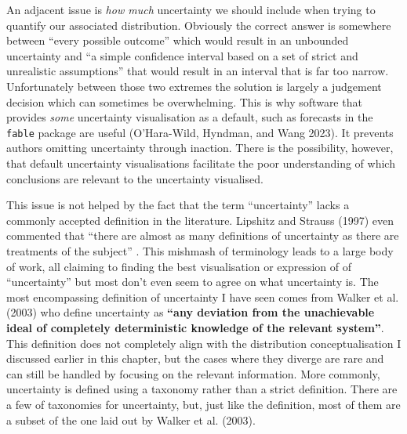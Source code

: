 \documentclass[
  letterpaper,
  DIV=11,
  numbers=noendperiod]{scrartcl}
\begin{document}
An adjacent issue is \emph{how much} uncertainty we should include when
trying to quantify our associated distribution. Obviously the correct
answer is somewhere between ``every possible outcome'' which would
result in an unbounded uncertainty and ``a simple confidence interval
based on a set of strict and unrealistic assumptions'' that would result
in an interval that is far too narrow. Unfortunately between those two
extremes the solution is largely a judgement decision which can
sometimes be overwhelming. This is why software that provides
\emph{some} uncertainty visualisation as a default, such as forecasts in
the \texttt{fable} package are useful (O'Hara-Wild, Hyndman, and Wang
2023). It prevents authors omitting uncertainty through inaction. There
is the possibility, however, that default uncertainty visualisations
facilitate the poor understanding of which conclusions are relevant to
the uncertainty visualised.

This issue is not helped by the fact that the term ``uncertainty'' lacks
a commonly accepted definition in the literature. Lipshitz and Strauss
(1997) even commented that ``there are almost as many definitions of
uncertainty as there are treatments of the subject'' . This mishmash of
terminology leads to a large body of work, all claiming to finding the
best visualisation or expression of of ``uncertainty'' but most don't
even seem to agree on what uncertainty is. The most encompassing
definition of uncertainty I have seen comes from Walker et al. (2003)
who define uncertainty as \textbf{``any deviation from the unachievable
ideal of completely deterministic knowledge of the relevant system''}.
This definition does not completely align with the distribution
conceptualisation I discussed earlier in this chapter, but the cases
where they diverge are rare and can still be handled by focusing on the
relevant information. More commonly, uncertainty is defined using a
taxonomy rather than a strict definition. There are a few of taxonomies
for uncertainty, but, just like the definition, most of them are a
subset of the one laid out by Walker et al. (2003).
\end{document}
